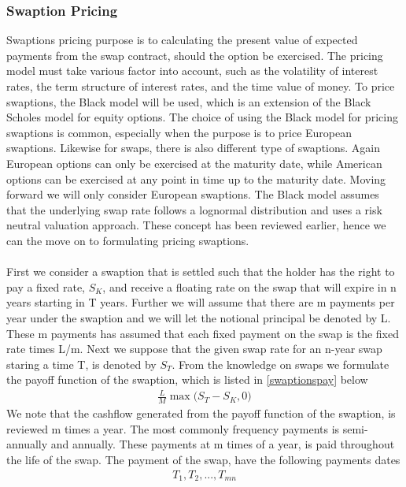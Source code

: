 \subsubsection{Swaption Pricing}
Swaptions pricing purpose is to calculating the present value of expected payments from the swap contract,
should the option be exercised. The pricing model must take various factor into account, such as the
volatility of interest rates, the term structure of interest rates, and the time value of money. 
To price swaptions, the Black model will be used, which is an extension of the Black Scholes
model for equity options. The choice of using the Black model for pricing swaptions is common, especially when
the purpose is to price European swaptions. Likewise for swaps, there is also different type of swaptions. 
Again European options can only be exercised at the maturity date, while American options can be exercised
at any point in time up to the maturity date. Moving forward we will only consider European swaptions. 
The Black model assumes that the underlying swap rate follows a lognormal distribution and uses a 
risk neutral valuation approach. These concept has been reviewed earlier, hence we can the move on to 
formulating pricing swaptions.
\\\\
First we consider a swaption that is settled such that the holder has the right to pay a fixed rate, $S_K$, 
and receive a floating rate on the swap that will expire in n years starting in T years.
Further we will assume that there are m payments 
per year under the swaption and we will let the notional principal be denoted by L. These m payments has
assumed that each fixed payment on the swap is the fixed rate times L/m. Next we suppose that 
the given swap rate for an n-year swap staring a time T, is denoted by $S_T$. 
From the knowledge on swaps we formulate the payoff function of the swaption, which is listed in
\autoref{swaptionspay} below
\begin{align}
    \frac{L}{M} \max \Big( S_T - S_K, 0 \Big)
    \label{swaptionspay}
\end{align}
We note that the cashflow generated from the payoff function of the swaption, is reviewed m times 
a year. The most commonly frequency payments is semi-annually and annually. These payments at m times
of a year, is paid throughout the life of the swap. The payment of the swap, have the following 
payments dates 
\begin{align*}
    T_1,T_2,...,T_{mn}
\end{align*}
